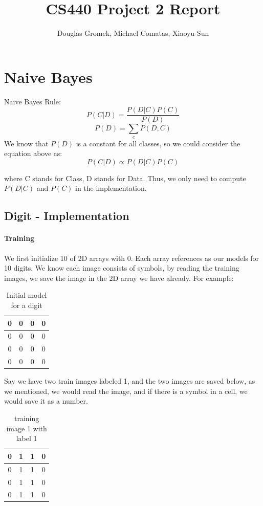 \documentclass[11pt]{report}
\title{CS440 Project 2 Report}
\author{Douglas Gromek, Michael Comatas, Xiaoyu Sun}
\begin{document}
\maketitle

\section*{Naive Bayes}

Naive Bayes Rule: $$P(C|D) = \frac{P(D|C)P(C)}{P(D)}$$
$$P(D) = \sum _c P(D,C)$$
We know that $P(D)$ is a constant for all classes, so we could consider the equation above as:
$$P(C|D) \propto P(D|C)P(C)$$

where C stands for Class, D stands for Data. Thus, we only need to compute $P(D|C)$ and $P(C)$ in the implementation.

\subsection*{Digit - Implementation}

\paragraph{Training}
We first initialize 10 of 2D arrays with 0. Each array references as our models for 10 digits.
We know each image consists of symbols, by reading the training images, we save the image in the 2D array we have already. 
For example: \\

\begin{table}[h!]
\centering
\begin{tabular}{|c |c |c |c|} 
 \hline
0&0&0&0\\ 
 \hline
0&0&0&0\\ 
 \hline
0&0&0&0\\ 
 \hline
0&0&0&0\\ 
 \hline
\end{tabular}
\caption{Initial model for a digit}
\end{table}

Say we have two train images labeled 1, and the two images are saved below, as we mentioned, we would read the image, and if there is a symbol in a cell, we would save it  as a number.\\ 
\begin{table}[h!]
\centering
\begin{tabular}{|c |c |c |c|} 
 \hline
0&1&1&0\\ 
 \hline
0&1&1&0\\ 
 \hline
0&1&1&0\\ 
 \hline
0&1&1&0\\ 
 \hline
\end{tabular}
\caption{training image 1 with label 1}
\end{table}
\end{document}
